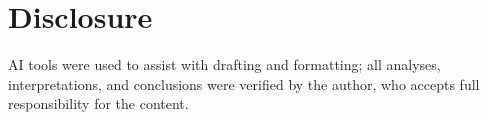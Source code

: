 \section*{Disclosure}
AI tools were used to assist with drafting and formatting; all analyses, interpretations, and conclusions were verified by the author, who accepts full responsibility for the content.